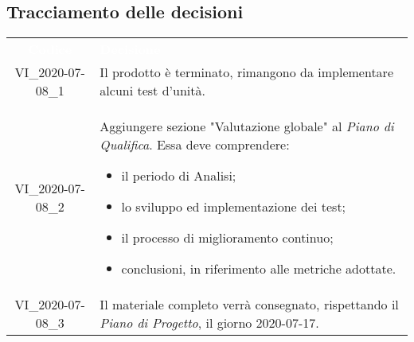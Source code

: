 \pagebreak

\subsection{Tracciamento delle decisioni}
\begin{longtable}{ c L{12cm} }
\textcolor{white}{\textbf{Codice}} & \centerline{\textcolor{white}{\textbf{Decisione}}}\\	
		VI\_2020-07-08\_1 & Il prodotto è terminato, rimangono da implementare alcuni test d'unità.\\
		VI\_2020-07-08\_2 & Aggiungere sezione "Valutazione globale" al \textit{Piano di Qualifica}. Essa deve comprendere: \begin{itemize}
		\item il periodo di Analisi;
		\item lo sviluppo ed implementazione dei test;
		\item il processo di miglioramento continuo;
		\item conclusioni, in riferimento alle metriche adottate.
\end{itemize}		\\
		VI\_2020-07-08\_3 & Il materiale completo verrà consegnato, rispettando il \textit{Piano di Progetto}, il giorno 2020-07-17. \\
\end{longtable}
